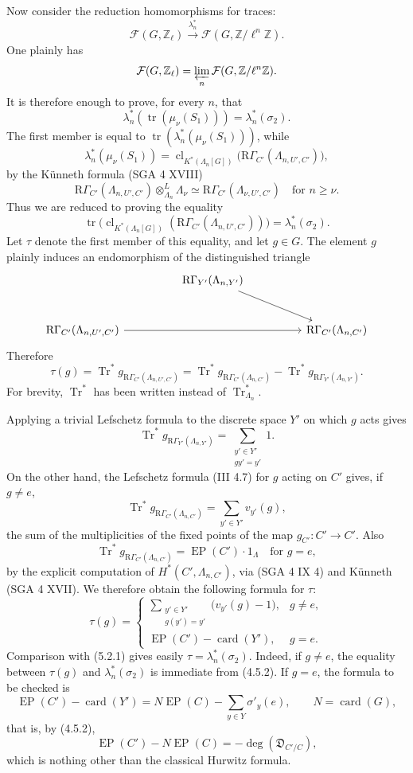 \documentclass[11pt]{article}
\providecommand{\Tr}{\operatorname{Tr}}
\providecommand{\EP}{\operatorname{EP}}
\providecommand{\Tr}{\operatorname{Tr}}
\providecommand{\Tr}{\operatorname{Tr}}
\providecommand{\Tr}{\operatorname{Tr}}
\providecommand{\EP}{\operatorname{EP}}
\providecommand{\clKstar}[1]{\operatorname{cl}_{K^*(#1)}}
\providecommand{\RG}{\mathrm R\Gamma}
\providecommand{\Tr}{\operatorname{Tr}}
\begin{document}
Now consider the reduction homomorphisms for traces:
\[
\mathcal F(G,\mathbb Z_\ell)\xrightarrow{\lambda_n^*}\mathcal F(G,\mathbb Z/\ell^n\mathbb Z).
\]
One plainly has
\[
\mathcal F(G,\mathbb Z_\ell)=\varprojlim_n\mathcal F(G,\mathbb Z/\ell^n\mathbb Z).
\]
It is therefore enough to prove, for every $n$, that
\[
\lambda_n^*(\operatorname{tr}(\mu_\nu(S_1)))=\lambda_n^*(\sigma_2).
\]
The first member is equal to $\operatorname{tr}(\lambda_n^*(\mu_\nu(S_1)))$, while
\[
\lambda_n^*(\mu_\nu(S_1))
=
\clKstar{\Lambda_n[G]}\bigl(\RG_{C'}(\Lambda_{n,U',C'})\bigr),
\]
by the Künneth formula (SGA 4 XVIII)
\[
\RG_{C'}(\Lambda_{n,U',C'})\otimes_{\Lambda_n}^{L}\Lambda_\nu
\simeq \RG_{C'}(\Lambda_{\nu,U',C'})
\quad\text{for } n\ge\nu.
\]
Thus we are reduced to proving the equality
\[
\operatorname{tr}\bigl(\clKstar{\Lambda_n[G]}(\RG_{C'}(\Lambda_{n,U',C'}))\bigr)
=
\lambda_n^*(\sigma_2).
\]
Let $\tau$ denote the first member of this equality, and let $g\in G$. The element $g$ plainly induces an endomorphism of the distinguished triangle
\[
\begin{tikzcd}[column sep=huge,row sep=large]
& \RG_{Y'}(\Lambda_{n,Y'}) \arrow[dr] & \\
\RG_{C'}(\Lambda_{n,U',C'}) \arrow[rr] && \RG_{C'}(\Lambda_{n,C'})
\end{tikzcd}
\]
Therefore
\[
\tau(g)=\Tr^*g_{\RG_{C'}(\Lambda_{n,U',C'})}
=\Tr^*g_{\RG_{C'}(\Lambda_{n,C'})}
-\Tr^*g_{\RG_{Y'}(\Lambda_{n,Y'})}.
\]
For brevity, $\Tr^*$ has been written instead of $\Tr^*_{\Lambda_n}$.

Applying a trivial Lefschetz formula to the discrete space $Y'$ on which $g$ acts gives
\[
\Tr^*g_{\RG_{Y'}(\Lambda_{n,Y'})}
=
\sum_{\substack{y'\in Y'\\gy'=y'}}1.
\]
On the other hand, the Lefschetz formula (III 4.7) for $g$ acting on $C'$ gives, if $g\ne e$,
\[
\Tr^*g_{\RG_{C'}(\Lambda_{n,C'})}
=
\sum_{y'\in Y'} v_{y'}(g),
\]
the sum of the multiplicities of the fixed points of the map $g_{C'}:C'\to C'$. Also
\[
\Tr^*g_{\RG_{C'}(\Lambda_{n,C'})}=\EP(C')\cdot1_\Lambda
\quad\text{for }g=e,
\]
by the explicit computation of $H^*(C',\Lambda_{n,C'})$, via (SGA 4 IX 4) and Künneth (SGA 4 XVII). We therefore obtain the following formula for $\tau$:
\[
\tau(g)=
\begin{cases}
\displaystyle\sum_{\substack{y'\in Y'\\g(y')=y'}}\bigl(v_{y'}(g)-1\bigr),& g\ne e,\\[0.8em]
\EP(C')-\operatorname{card}(Y'),& g=e.
\end{cases}
\tag{5.2.2}
\]
Comparison with (5.2.1) gives easily $\tau=\lambda_n^*(\sigma_2)$. Indeed, if $g\ne e$, the equality between $\tau(g)$ and $\lambda_n^*(\sigma_2)$ is immediate from (4.5.2). If $g=e$, the formula to be checked is
\[
\EP(C')-\operatorname{card}(Y')
=
N\EP(C)-\sum_{y\in Y}\sigma'_y(e),
\qquad N=\operatorname{card}(G),
\]
that is, by (4.5.2),
\[
\EP(C')-N\EP(C)=-\deg(\mathfrak D_{C'/C}),
\]
which is nothing other than the classical Hurwitz formula.
\end{document}
